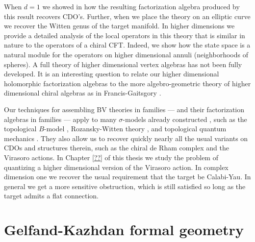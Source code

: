 \documentclass[10pt]{amsart}
\begin{document}
When $d=1$ we showed in \cite{GGW} how the resulting factorization algebra produced by this result recovers CDO's. 
Further, when we place the theory on an elliptic curve we recover the Witten genus of the target manifold. 
In higher dimensions we provide a detailed analysis of the local operators in this theory that is similar in nature to the operators of a chiral CFT. 
Indeed, we show how the state space is a natural module for the operators on higher dimensional annuli (neighborhoods of spheres). 
A full theory of higher dimensional vertex algebras has not been fully developed. 
It is an interesting question to relate our higher dimensional holomorphic factorization algebras to the more algebro-geometric theory of higher dimensional chiral algebras as in Francis-Gaitsgory \cite{FrancisGaitsgory}. 


Our techniques for assembling BV theories in families --- and their factorization algebras in families --- apply to many $\sigma$-models already constructed , such as the topological $B$-model \cite{LiLi}, Rozansky-Witten theory \cite{CLL}, and topological quantum mechanics \cite{GG1, GLL}. 
They also allow us to recover quickly nearly all the usual variants on CDOs and structures therein, such as the chiral de Rham complex and the Virasoro actions.
In Chapter \ref{??} of this thesis we study the problem of quantizing a higher dimensional version of the Virasoro action. 
In complex dimension one we recover the usual requirement that the target be Calabi-Yau. 
In general we get a more sensitive obstruction, which is still satisfied so long as the target admits a flat connection.



\section{Gelfand-Kazhdan formal geometry}
\end{document}
